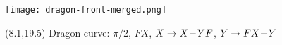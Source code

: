 \documentclass[final]{beamer}
\newcommand{\nt}{\negthinspace}
\newcommand{\m}{\nt-\nt}
\newcommand{\p}{\nt+\nt}
\begin{document}
\begin{frame}{}
\texttt{[image: dragon-front-merged.png]}
\begin{textblock}{20}(8.1,19.5)
Dragon curve: $\pi/2$, $FX$, $X\to X\m YF$, $Y\to FX\p Y$
\end{textblock}
\end{frame}
\end{document}
